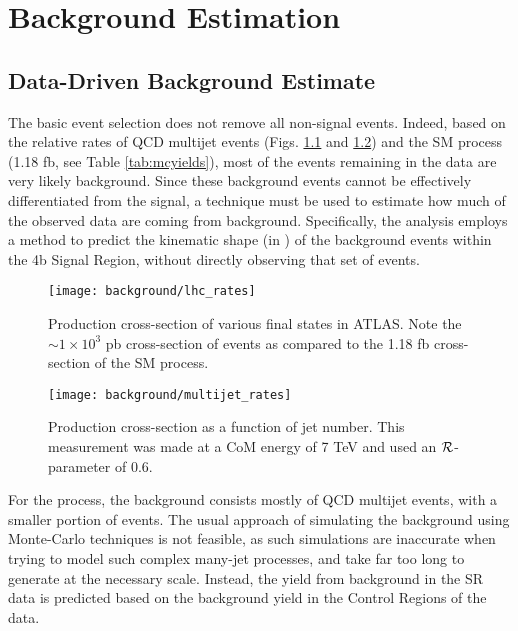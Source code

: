 \chapter{Background Estimation} \label{chapter:background}

\FloatBarrier
\section{Data-Driven Background Estimate}

    The basic event selection does not remove all non-signal events.
    Indeed, based on the relative rates of QCD multijet events (Figs. \ref{fig:lhc_rates} and \ref{fig:multijet_rates}) and the SM \vbfhhproc process (1.18 fb, see Table \ref{tab:mcyields}),
        most of the events remaining in the data are very likely background.
    Since these background events cannot be effectively differentiated from the signal,
        a technique must be used to estimate how much of the observed data are coming from background.
    Specifically, the analysis employs a method to predict the kinematic shape (in \mhh)
        of the background events within the 4b Signal Region,
        without directly observing that set of events.

    \begin{figure}[tbh]
        \texttt{[image: background/lhc\_rates]}
        \caption{
            Production cross-section of various final states in ATLAS\cite{atlas_sm_summary}.
            Note the $\sim 1 \times 10^3$ pb cross-section of \ttbar events
                as compared to the 1.18 fb cross-section of the SM \vbfhhproc process.
        }
        \label{fig:lhc_rates}
    \end{figure}


    \begin{figure}[tbh]
        \texttt{[image: background/multijet\_rates]}
        \caption{
            Production cross-section as a function of jet number\cite{multijet_measurement}.
            This measurement was made at a CoM energy of 7 TeV and used an \antikt $\mathcal{R}$-parameter of 0.6.
        }
        \label{fig:multijet_rates}
    \end{figure}

    For the \vbfproc process, the background consists mostly of QCD multijet events,
        with a smaller portion of \ttbar events.
    The usual approach of simulating the background using Monte-Carlo techniques is not feasible,
        as such simulations are inaccurate when trying to model such complex many-jet processes,
        and take far too long to generate at the necessary scale.
    Instead, the yield from background in the SR data is predicted based on the background yield in the Control Regions of the data.
        
